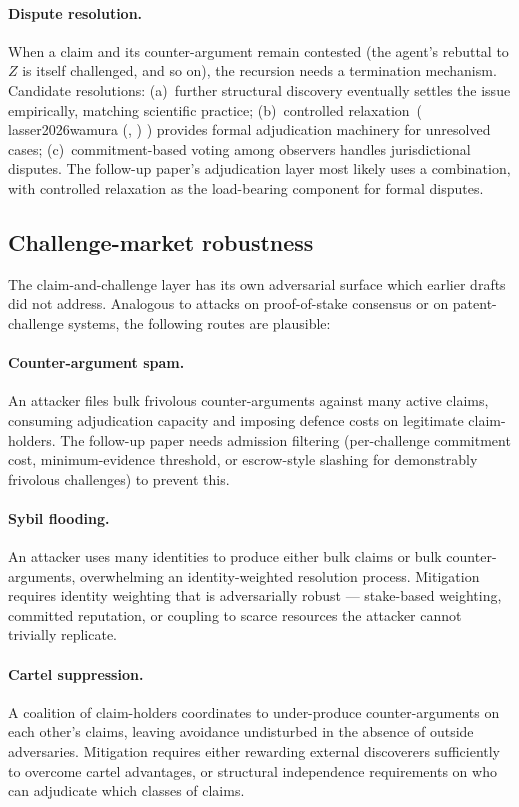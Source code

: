 \documentclass{article}
\makeatletter
\newcommand{\citep}[2][]{%
  \begingroup
  \def\@tmpkey{#2}%
  \ifx\@tmpkey\@empty\else
    (\ifx\@empty#1\@empty\else #1, \fi
     \@nameuse{bibkey@\@tmpkey})%
  \fi
  \endgroup
}
\makeatother
\begin{document}
\paragraph{Dispute resolution.}
When a claim and its counter-argument remain contested (the
agent's rebuttal to $Z$ is itself challenged, and so on), the
recursion needs a termination mechanism.  Candidate resolutions:
(a)~further structural discovery eventually settles the issue
empirically, matching scientific practice; (b)~controlled
relaxation~(\citep{lasser2026wamura}) provides formal
adjudication machinery for unresolved cases; (c)~commitment-based
voting among observers handles jurisdictional disputes.  The
follow-up paper's adjudication layer most likely uses a
combination, with controlled relaxation as the load-bearing
component for formal disputes.

\subsection{Challenge-market robustness}

The claim-and-challenge layer has its own adversarial surface
which earlier drafts did not address.  Analogous to attacks on
proof-of-stake consensus or on patent-challenge systems, the
following routes are plausible:

\paragraph{Counter-argument spam.}
An attacker files bulk frivolous counter-arguments against many
active claims, consuming adjudication capacity and imposing
defence costs on legitimate claim-holders.  The follow-up paper
needs admission filtering (per-challenge commitment cost,
minimum-evidence threshold, or escrow-style slashing for
demonstrably frivolous challenges) to prevent this.

\paragraph{Sybil flooding.}
An attacker uses many identities to produce either bulk claims
or bulk counter-arguments, overwhelming an identity-weighted
resolution process.  Mitigation requires identity weighting that
is adversarially robust --- stake-based weighting, committed
reputation, or coupling to scarce resources the attacker cannot
trivially replicate.

\paragraph{Cartel suppression.}
A coalition of claim-holders coordinates to under-produce
counter-arguments on each other's claims, leaving avoidance
undisturbed in the absence of outside adversaries.  Mitigation
requires either rewarding external discoverers sufficiently to
overcome cartel advantages, or structural independence
requirements on who can adjudicate which classes of claims.
\end{document}
